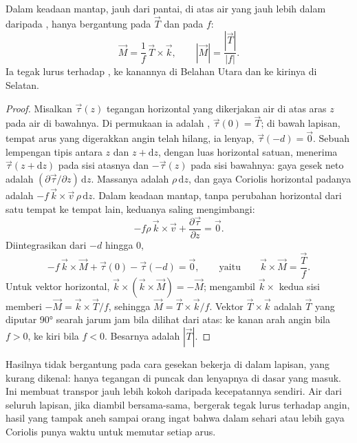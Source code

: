 \begin{theorem}\label{thm:b1:ocean-circulation:ekman}
Dalam keadaan mantap, jauh dari pantai, di atas air yang jauh lebih dalam daripada ,  hanya bergantung pada  $\vec T$ dan pada  $f$:
\[
  \vec M = \frac{1}{f}\,\vec T\times\vec k,
  \qquad |\vec M| = \frac{|\vec T|}{|f|}.
\]
Ia tegak lurus terhadap , ke kanannya di Belahan Utara dan ke kirinya di Selatan.
\end{theorem}

\begin{proof}
Misalkan $\vec\tau(z)$ tegangan horizontal yang dikerjakan air di atas aras $z$
pada air di bawahnya. Di permukaan ia adalah , $\vec\tau(0) =
\vec T$; di bawah lapisan, tempat arus yang digerakkan angin telah hilang, ia lenyap, $\vec\tau(-d) = \vec 0$. Sebuah lempengan tipis antara $z$ dan $z + \mathrm dz$, dengan luas horizontal satuan,
menerima $\vec\tau(z + \mathrm dz)$ pada sisi atasnya dan
$-\vec\tau(z)$ pada sisi bawahnya: gaya gesek neto adalah $(\partial\vec
\tau/\partial z)\,\mathrm dz$. Massanya adalah $\rho\,\mathrm dz$, dan gaya
Coriolis horizontal padanya adalah $-f\,\vec k\times\vec v\,\rho\,\mathrm dz$. Dalam keadaan
mantap, tanpa perubahan horizontal dari satu tempat ke tempat lain, keduanya saling mengimbangi:
\[
  -f\rho\,\vec k\times\vec v + \frac{\partial\vec\tau}{\partial z} = \vec 0 .
\]
Diintegrasikan dari $-d$ hingga $0$,
\[
  -f\,\vec k\times\vec M + \vec\tau(0) - \vec\tau(-d) = \vec 0,
  \qquad\text{yaitu}\qquad \vec k\times\vec M = \frac{\vec T}{f}.
\]
Untuk vektor horizontal, $\vec k\times(\vec k\times\vec M) = -\vec M$; mengambil
$\vec k\times$ kedua sisi memberi $-\vec M = \vec k\times\vec T/f$, sehingga $\vec M =
\vec T\times\vec k/f$. Vektor $\vec T\times\vec k$ adalah $\vec T$ yang diputar
\ang{90} searah jarum jam bila dilihat dari atas: ke kanan arah angin bila $f > 0$, ke kiri
bila $f < 0$. Besarnya adalah $|\vec T|$.
\end{proof}

Hasilnya tidak bergantung pada cara gesekan bekerja di dalam lapisan, yang kurang dikenal: hanya tegangan di puncak dan lenyapnya di dasar yang masuk. Ini membuat transpor jauh lebih kokoh daripada kecepatannya sendiri. Air dari seluruh lapisan, jika diambil bersama-sama, bergerak tegak lurus terhadap angin, hasil yang tampak aneh sampai orang ingat bahwa dalam sehari atau lebih gaya Coriolis punya waktu untuk memutar setiap arus.


